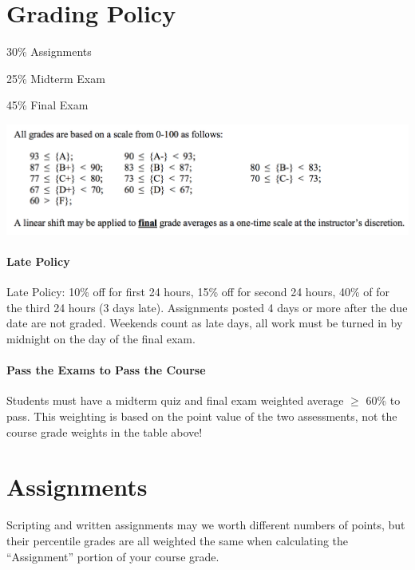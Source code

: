 \documentclass[12pt]{article}
\begin{document}
\section{Grading Policy}
\begin{description}
  \item{30\%} Assignments
  \item{25\%} Midterm Exam
  \item{45\%} Final Exam
\end{description}

\includegraphics[width=\linewidth]{scale}
  
\paragraph{Late Policy}
Late Policy: 10\% off for first 24 hours, 15\% off for second 24 hours, 40\% of for the third 24 hours (3 days late). Assignments posted 4 days or more
after the due date are not graded. Weekends count as late days, all work must be turned in by midnight on the day of the final exam.

\paragraph{Pass the Exams to Pass the Course}
Students must have a midterm quiz and final exam weighted average $\geq$ 60\% to pass. This weighting is based on the point value of the two assessments,
not the course grade weights in the table above!

\section{Assignments}
Scripting and written assignments may we worth different numbers of points, but their percentile grades are all weighted the same when calculating
the ``Assignment'' portion of your course grade.
\end{document}
